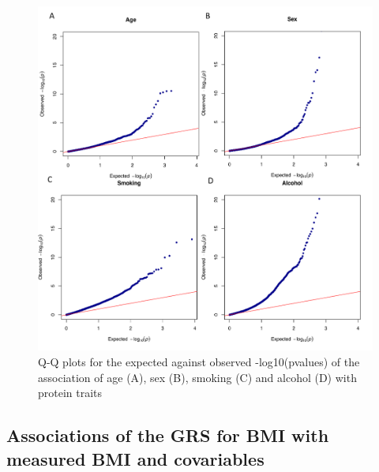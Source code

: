 \documentclass[11pt,twoside]{bristolthesis}
\begin{document}
\begin{figure}
\includegraphics[width=1\linewidth,height=1\textheight]{figure/BMI_protein_INTERVAL/QQ_confounder_proteins} \caption[Q-Q plots of the expected against observed -log10(pvalues) for the associations between covariables and protein traits]{Q-Q plots for the expected against observed -log10(pvalues) of the association of age (A), sex (B), smoking (C) and alcohol (D) with protein traits}\label{fig:QQ-confounder-proteins}
\end{figure}
\hypertarget{associations-of-the-grs-for-bmi-with-measured-bmi-and-covariables}{%
\subsection{Associations of the GRS for BMI with measured BMI and covariables}\label{associations-of-the-grs-for-bmi-with-measured-bmi-and-covariables}}
\end{document}
